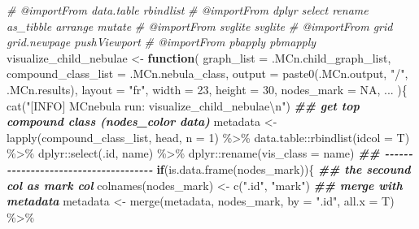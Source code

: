 \documentclass[
]{article}
\newenvironment{Shaded}{\begin{snugshade}}{\end{snugshade}}
\newcommand{\AttributeTok}[1]{\textcolor[rgb]{0.77,0.63,0.00}{#1}}
\newcommand{\CommentTok}[1]{\textcolor[rgb]{0.56,0.35,0.01}{\textit{#1}}}
\newcommand{\ConstantTok}[1]{\textcolor[rgb]{0.00,0.00,0.00}{#1}}
\newcommand{\ControlFlowTok}[1]{\textcolor[rgb]{0.13,0.29,0.53}{\textbf{#1}}}
\newcommand{\DecValTok}[1]{\textcolor[rgb]{0.00,0.00,0.81}{#1}}
\newcommand{\DocumentationTok}[1]{\textcolor[rgb]{0.56,0.35,0.01}{\textbf{\textit{#1}}}}
\newcommand{\FunctionTok}[1]{\textcolor[rgb]{0.00,0.00,0.00}{#1}}
\newcommand{\NormalTok}[1]{#1}
\newcommand{\OtherTok}[1]{\textcolor[rgb]{0.56,0.35,0.01}{#1}}
\newcommand{\SpecialCharTok}[1]{\textcolor[rgb]{0.00,0.00,0.00}{#1}}
\newcommand{\StringTok}[1]{\textcolor[rgb]{0.31,0.60,0.02}{#1}}
\begin{document}
\begin{Shaded}
\begin{Highlighting}[]
\CommentTok{\#\textquotesingle{} @importFrom data.table rbindlist}
\CommentTok{\#\textquotesingle{} @importFrom dplyr select rename as\_tibble arrange mutate}
\CommentTok{\#\textquotesingle{} @importFrom svglite svglite}
\CommentTok{\#\textquotesingle{} @importFrom grid grid.newpage pushViewport}
\CommentTok{\#\textquotesingle{} @importFrom pbapply pbmapply}
\NormalTok{visualize\_child\_nebulae }\OtherTok{\textless{}{-}}
  \ControlFlowTok{function}\NormalTok{(}
           \AttributeTok{graph\_list =}\NormalTok{ .MCn.child\_graph\_list,}
           \AttributeTok{compound\_class\_list =}\NormalTok{ .MCn.nebula\_class,}
           \AttributeTok{output =} \FunctionTok{paste0}\NormalTok{(.MCn.output, }\StringTok{"/"}\NormalTok{, .MCn.results),}
           \AttributeTok{layout =} \StringTok{"fr"}\NormalTok{,}
           \AttributeTok{width =} \DecValTok{23}\NormalTok{,}
           \AttributeTok{height =} \DecValTok{30}\NormalTok{,}
           \AttributeTok{nodes\_mark =} \ConstantTok{NA}\NormalTok{,}
\NormalTok{           ...}
\NormalTok{           )\{}
    \FunctionTok{cat}\NormalTok{(}\StringTok{"[INFO] MCnebula run: visualize\_child\_nebulae}\SpecialCharTok{\textbackslash{}n}\StringTok{"}\NormalTok{)}
    \DocumentationTok{\#\# get top compound class (nodes\_color data)}
\NormalTok{    metadata }\OtherTok{\textless{}{-}} \FunctionTok{lapply}\NormalTok{(compound\_class\_list, head, }\AttributeTok{n =} \DecValTok{1}\NormalTok{) }\SpecialCharTok{\%\textgreater{}\%}
\NormalTok{      data.table}\SpecialCharTok{::}\FunctionTok{rbindlist}\NormalTok{(}\AttributeTok{idcol =}\NormalTok{ T) }\SpecialCharTok{\%\textgreater{}\%}
\NormalTok{      dplyr}\SpecialCharTok{::}\FunctionTok{select}\NormalTok{(.id, name) }\SpecialCharTok{\%\textgreater{}\%}
\NormalTok{      dplyr}\SpecialCharTok{::}\FunctionTok{rename}\NormalTok{(}\AttributeTok{vis\_class =}\NormalTok{ name)}
    \DocumentationTok{\#\# {-}{-}{-}{-}{-}{-}{-}{-}{-}{-}{-}{-}{-}{-}{-}{-}{-}{-}{-}{-}{-}{-}{-}{-}{-}{-}{-}{-}{-}{-}{-}{-}{-}{-}{-}{-}{-} }
    \ControlFlowTok{if}\NormalTok{(}\FunctionTok{is.data.frame}\NormalTok{(nodes\_mark))\{}
      \DocumentationTok{\#\# the secound col as mark col}
      \FunctionTok{colnames}\NormalTok{(nodes\_mark) }\OtherTok{\textless{}{-}} \FunctionTok{c}\NormalTok{(}\StringTok{".id"}\NormalTok{, }\StringTok{"mark"}\NormalTok{)}
      \DocumentationTok{\#\# merge with metadata}
\NormalTok{      metadata }\OtherTok{\textless{}{-}} \FunctionTok{merge}\NormalTok{(metadata, nodes\_mark, }\AttributeTok{by =} \StringTok{".id"}\NormalTok{, }\AttributeTok{all.x =}\NormalTok{ T) }\SpecialCharTok{\%\textgreater{}\%} 

\end{Highlighting}
\end{Shaded}
\end{document}
